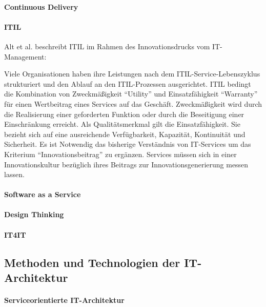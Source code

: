 \cite{Alt2017}

\paragraph{Continuous Delivery}

\paragraph{ITIL}
Alt et al. beschreibt ITIL im Rahmen des Innovationsdrucks vom IT-Management:

Viele Organisationen haben ihre Leistungen nach dem ITIL-Service-Lebenszyklus strukturiert und den Ablauf an den ITIL-Prozessen ausgerichtet. ITIL bedingt die Kombination von Zweckmäßigkeit \enquote{Utility} und Einsatzfähigkeit \enquote{Warranty} für einen Wertbeitrag eines Services auf das Geschäft. Zweckmäßigkeit wird durch die Realisierung einer geforderten Funktion oder durch die Beseitigung einer Einschränkung erreicht. Als Qualitätsmerkmal gilt die Einsatzfähigkeit. Sie bezieht sich auf eine ausreichende Verfügbarkeit, Kapazität, Kontinuität und Sicherheit. Es ist Notwendig das bisherige Verständnis von IT-Services um das Kriterium \enquote{Innovationsbeitrag} zu ergänzen. Services müssen sich in einer Innovationskultur bezüglich ihres Beitrags zur Innovationsgenerierung messen lassen.

\cite{Alt2017}


\paragraph{Software as a Service}

\paragraph{Design Thinking}


\paragraph{IT4IT}

\subsection{Methoden und Technologien der IT-Architektur}

\paragraph{Serviceorientierte IT-Architektur}


